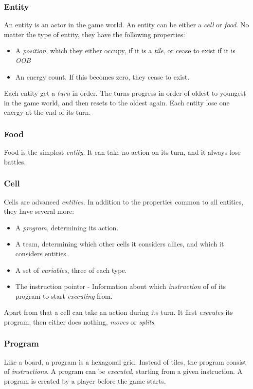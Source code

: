 \subsubsection{Entity}
An entity is an actor in the game world. An entity can be either a \emph{cell} or \emph{food}. No matter the type of entity, they have the following properties:
\begin{itemize}
\item A \emph{position}, which they either occupy, if it is a \emph{tile}, or cease to exist if it is \emph{OOB}
\item An energy count. If this becomes zero, they cease to exist.
\end{itemize}
Each entity get a \emph{turn} in order. The turns progress in order of oldest to youngest in the game world, and then resets to the oldest again. Each entity lose one energy at the end of its turn.

\subsubsection{Food}
Food is the simplest \emph{entity}. It can take no action on its turn, and it always lose battles.

\subsubsection{Cell}
Cells are advanced \emph{entities}. In addition to the properties common to all entities, they have several more:
\begin{itemize}
\item A \emph{program}, determining its action.
\item A team, determining which other cells it considers allies, and which it considers entities.
\item A set of \emph{variables}, three of each type.
\item The instruction pointer - Information about which \emph{instruction} of of its program to start \emph{executing} from.
\end{itemize}
Apart from that a cell can take an action during its turn. It first \emph{executes} its program, then either does nothing, \emph{moves} or \emph{splits}.

\subsubsection{Program}
Like a board, a program is a hexagonal grid. Instead of tiles, the program consist of \emph{instructions}. A program can be \emph{executed}, starting from a given instruction. A program is created by a player before the game starts.


